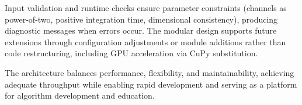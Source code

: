 Input validation and runtime checks ensure parameter constraints (channels as power-of-two, positive integration time, dimensional consistency), producing diagnostic messages when errors occur. The modular design supports future extensions through configuration adjustments or module additions rather than code restructuring, including GPU acceleration via CuPy substitution.

The architecture balances performance, flexibility, and maintainability, achieving adequate throughput while enabling rapid development and serving as a platform for algorithm development and education.
